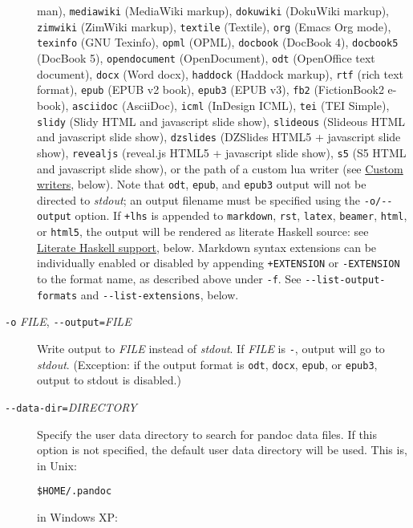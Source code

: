 \documentclass[]{article}
\begin{document}
\begin{description}
man), \texttt{mediawiki} (MediaWiki markup), \texttt{dokuwiki} (DokuWiki
markup), \texttt{zimwiki} (ZimWiki markup), \texttt{textile} (Textile),
\texttt{org} (Emacs Org mode), \texttt{texinfo} (GNU Texinfo),
\texttt{opml} (OPML), \texttt{docbook} (DocBook 4), \texttt{docbook5}
(DocBook 5), \texttt{opendocument} (OpenDocument), \texttt{odt}
(OpenOffice text document), \texttt{docx} (Word docx), \texttt{haddock}
(Haddock markup), \texttt{rtf} (rich text format), \texttt{epub} (EPUB
v2 book), \texttt{epub3} (EPUB v3), \texttt{fb2} (FictionBook2 e-book),
\texttt{asciidoc} (AsciiDoc), \texttt{icml} (InDesign ICML),
\texttt{tei} (TEI Simple), \texttt{slidy} (Slidy HTML and javascript
slide show), \texttt{slideous} (Slideous HTML and javascript slide
show), \texttt{dzslides} (DZSlides HTML5 + javascript slide show),
\texttt{revealjs} (reveal.js HTML5 + javascript slide show), \texttt{s5}
(S5 HTML and javascript slide show), or the path of a custom lua writer
(see \protect\hyperlink{custom-writers}{Custom writers}, below). Note
that \texttt{odt}, \texttt{epub}, and \texttt{epub3} output will not be
directed to \emph{stdout}; an output filename must be specified using
the \texttt{-o/-\/-output} option. If \texttt{+lhs} is appended to
\texttt{markdown}, \texttt{rst}, \texttt{latex}, \texttt{beamer},
\texttt{html}, or \texttt{html5}, the output will be rendered as
literate Haskell source: see
\protect\hyperlink{literate-haskell-support}{Literate Haskell support},
below. Markdown syntax extensions can be individually enabled or
disabled by appending \texttt{+EXTENSION} or \texttt{-EXTENSION} to the
format name, as described above under \texttt{-f}. See
\texttt{-\/-list-output-formats} and \texttt{-\/-list-extensions},
below.
\item[\texttt{-o} \emph{FILE}, \texttt{-\/-output=}\emph{FILE}]
Write output to \emph{FILE} instead of \emph{stdout}. If \emph{FILE} is
\texttt{-}, output will go to \emph{stdout}. (Exception: if the output
format is \texttt{odt}, \texttt{docx}, \texttt{epub}, or \texttt{epub3},
output to stdout is disabled.)
\item[\texttt{-\/-data-dir=}\emph{DIRECTORY}]
Specify the user data directory to search for pandoc data files. If this
option is not specified, the default user data directory will be used.
This is, in Unix:

\begin{verbatim}
$HOME/.pandoc
\end{verbatim}

in Windows XP:


\end{description}
\end{document}
